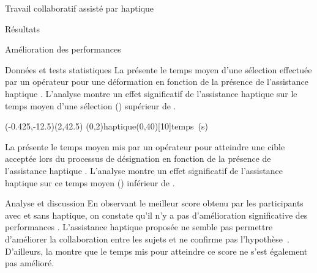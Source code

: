 \documentclass[myfrancais,ngerman,english,french]{mythesis}
\begin{document}
\begin{mychapter}{Travail collaboratif assisté par haptique}
\begin{mysection}{Résultats}
\begin{mysubsection}{Amélioration des performances}
\begin{mysubsubsection}{Données et tests statistiques}
					La  présente le temps moyen d'une sélection effectuée par un opérateur pour une déformation  en fonction de la présence de l'assistance haptique .
					L'analyse montre un effet significatif de l'assistance haptique  sur le temps moyen d'une sélection  () supérieur de .

					\begin{myfigure}
						\begin{myps}(-0.425,-12.5)(2,42.5)
							\myaxes(0,2){haptique}(0,40)[10]{temps~(s)}
						\end{myps}
					\end{myfigure}

					La  présente le temps moyen mis par un opérateur pour atteindre une cible acceptée lors du processus de désignation  en fonction de la présence de l'assistance haptique .
					L'analyse montre un effet significatif de l'assistance haptique  sur ce temps moyen  () inférieur de .
				\end{mysubsubsection}
				\begin{mysubsubsection}{Analyse et discussion}
					En observant le meilleur score  obtenu par les participants avec et sans haptique, on constate qu'il n'y a pas d'amélioration significative des performances .
					L'assistance haptique proposée ne semble pas permettre d'améliorer la collaboration entre les sujets et ne confirme pas l'hypothèse~.
					D'ailleurs, la  montre que le temps mis pour atteindre ce score ne s'est également pas amélioré.


\end{mysubsubsection}
\end{mysubsection}
\end{mysection}
\end{mychapter}
\end{document}
